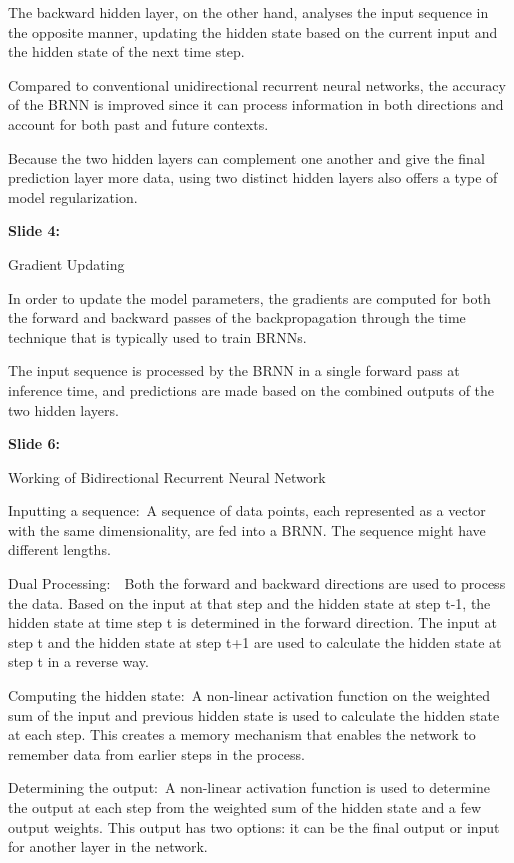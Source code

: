 \documentclass[11pt,a4paper]{article}
\begin{document}
The backward hidden layer, on the other hand, analyses the input sequence in the opposite manner, updating the hidden state based on the current input and the hidden state of the next time step.

Compared to conventional unidirectional recurrent neural networks, the accuracy of the BRNN is improved since it can process information in both directions and account for both past and future contexts.

Because the two hidden layers can complement one another and give the final prediction layer more data, using two distinct hidden layers also offers a type of model regularization.

\textbf{Slide 4:}

Gradient Updating

In order to update the model parameters, the gradients are computed for both the forward and backward passes of the backpropagation through the time technique that is typically used to train BRNNs.

The input sequence is processed by the BRNN in a single forward pass at inference time, and predictions are made based on the combined outputs of the two hidden layers.

\textbf{Slide 6:}

Working of Bidirectional Recurrent Neural Network

Inputting a sequence: A sequence of data points, each represented as a vector with the same dimensionality, are fed into a BRNN. The sequence might have different lengths.

Dual Processing:  Both the forward and backward directions are used to process the data. Based on the input at that step and the hidden state at step t-1, the hidden state at time step t is determined in the forward direction. The input at step t and the hidden state at step t+1 are used to calculate the hidden state at step t in a reverse way.

Computing the hidden state: A non-linear activation function on the weighted sum of the input and previous hidden state is used to calculate the hidden state at each step. This creates a memory mechanism that enables the network to remember data from earlier steps in the process.

Determining the output: A non-linear activation function is used to determine the output at each step from the weighted sum of the hidden state and a few output weights. This output has two options: it can be the final output or input for another layer in the network.
\end{document}
